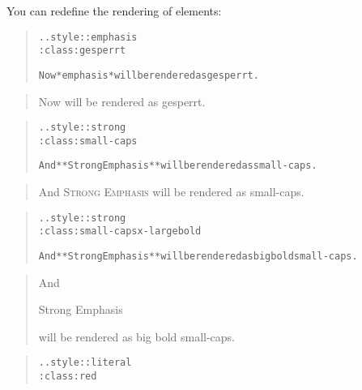 \documentclass[a5paper]{book}
\begin{document}
\begin{german}
You can redefine the rendering of elements:\par

\begin{quote}
\begin{alltt}
.. style:: emphasis
   :class: gesperrt

Now *emphasis* will be rendered as gesperrt.
\end{alltt}
\end{quote}

\begin{quotation}\noindent
\begin{container}
Now {} will be rendered as gesperrt.\par
\end{container}
\end{quotation}

\begin{quote}
\begin{alltt}
{\noindent}.. style:: strong
   :class: small-caps

And **Strong Emphasis** will be rendered as small-caps.
\end{alltt}
\end{quote}

\begin{quotation}\noindent
\begin{container}
And {\scshape{Strong Emphasis}} will be rendered as small-caps.\par
\end{container}
\end{quotation}

\begin{quote}
\begin{alltt}
{\noindent}.. style:: strong
   :class: small-caps x-large bold

And **Strong Emphasis** will be rendered as big bold small-caps.
\end{alltt}
\end{quote}

\begin{quotation}\noindent
\begin{container}
And {\bfseries{{\scshape{{\LARGE\strut{Strong Emphasis}}}}}} will be rendered as big bold small-caps.\par
\end{container}
\end{quotation}

\begin{quote}
\begin{alltt}
{\noindent}.. style:: literal
   :class: red


\end{alltt}
\end{quote}
\end{german}
\end{document}
